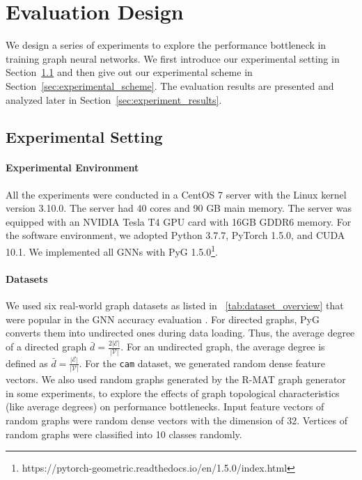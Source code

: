 \section{Evaluation Design}
\label{sec:experimental_design}

We design a series of experiments to explore the performance bottleneck in training graph neural networks.
We first introduce our experimental setting in Section~\ref{sec:experimental_env} and then give out our experimental scheme in Section~\ref{sec:experimental_scheme}.
The evaluation results are presented and analyzed later in Section~\ref{sec:experiment_results}.

\subsection{Experimental Setting}
\label{sec:experimental_env}

\paragraph{Experimental Environment}
All the experiments were conducted in a CentOS 7 server with the Linux kernel version 3.10.0.
The server had 40 cores and 90 GB main memory.
The server was equipped with an NVIDIA Tesla T4 GPU card with 16GB GDDR6 memory.
For the software environment, we adopted Python 3.7.7, PyTorch 1.5.0, and CUDA 10.1.
We implemented all GNNs with PyG 1.5.0\footnote{https://pytorch-geometric.readthedocs.io/en/1.5.0/index.html}.

\paragraph{Datasets}
We used six real-world graph datasets as listed in \tablename~\ref{tab:dataset_overview} that were popular in the GNN accuracy evaluation \cite{yang2016_revisiting_semisupervised, zeng2020_graphsaint, shchur2018_pitfall_of_gnn}.
For directed graphs, PyG converts them into undirected ones during data loading.
Thus, the average degree of a directed graph $\bar{d}=\frac{2|\mathcal{E}|}{|\mathcal{V}|}$.
For an undirected graph, the average degree is defined as $\bar{d}=\frac{|\mathcal{E}|}{|\mathcal{V}|}$.
For the \texttt{cam} dataset, we generated random dense feature vectors.
We also used random graphs generated by the R-MAT graph generator \cite{rmat-generator} in some experiments, to explore the effects of graph topological characteristics (like average degrees) on performance bottlenecks.
Input feature vectors of random graphs were random dense vectors with the dimension of 32.
Vertices of random graphs were classified into 10 classes randomly.

